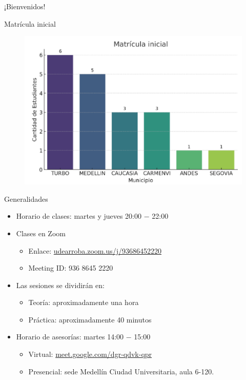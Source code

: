 \begin{frame}
    \begin{center}
        \Huge ¡Bienvenidos!
    \end{center}
\end{frame}

\begin{frame}{Matrícula inicial}
    \begin{figure}
        \centering
        \includegraphics[width=0.8\linewidth]{figures/matricula-inicial.png}
    \end{figure}
\end{frame}

\begin{frame}{Generalidades}
    \begin{itemize}
        \item Horario de clases: martes y jueves 20:00 $-$ 22:00
        \item Clases en Zoom
        
        \begin{itemize}
            \item Enlace: {\color{blue}\url{udearroba.zoom.us/j/93686452220}}
            \item Meeting ID: 936 8645 2220
        \end{itemize} 
        \item Las sesiones se dividirán en:
        \begin{itemize}
            \item Teoría: aproximadamente una hora
            \item Práctica: aproximadamente 40 minutos
        \end{itemize}
        \item Horario de asesorías: martes 14:00 $-$ 15:00
        \begin{itemize}
            \item Virtual: {\color{blue}\url{meet.google.com/dgr-qdvk-qpr}}
            \item Presencial: sede Medellín Ciudad Universitaria, aula 6-120.
        \end{itemize}
        
    \end{itemize}
\end{frame}

